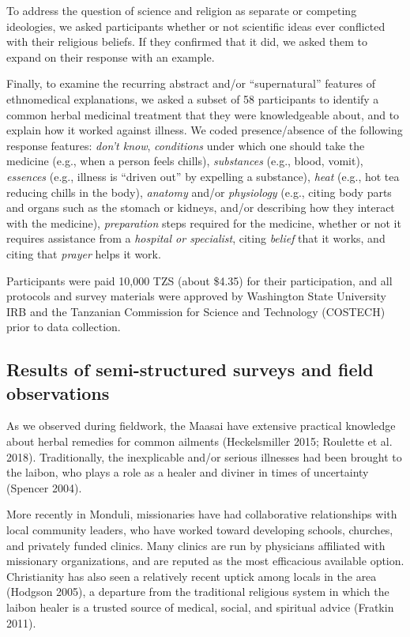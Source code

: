 \documentclass[
  11pt,
]{article}
\begin{document}
To address the question of science and religion as separate or competing ideologies, we asked participants whether or not scientific ideas ever conflicted with their religious beliefs. If they confirmed that it did, we asked them to expand on their response with an example.

Finally, to examine the recurring abstract and/or ``supernatural'' features of ethnomedical explanations, we asked a subset of 58 participants to identify a common herbal medicinal treatment that they were knowledgeable about, and to explain how it worked against illness. We coded presence/absence of the following response features: \emph{don't know}, \emph{conditions} under which one should take the medicine (e.g., when a person feels chills), \emph{substances} (e.g., blood, vomit), \emph{essences} (e.g., illness is ``driven out'' by expelling a substance), \emph{heat} (e.g., hot tea reducing chills in the body), \emph{anatomy} and/or \emph{physiology} (e.g., citing body parts and organs such as the stomach or kidneys, and/or describing how they interact with the medicine), \emph{preparation} steps required for the medicine, whether or not it requires assistance from a \emph{hospital or specialist}, citing \emph{belief} that it works, and citing that \emph{prayer} helps it work.

Participants were paid 10,000 TZS (about \$4.35) for their participation, and all protocols and survey materials were approved by Washington State University IRB and the Tanzanian Commission for Science and Technology (COSTECH) prior to data collection.

\hypertarget{results-of-semi-structured-surveys-and-field-observations}{%
\subsection{Results of semi-structured surveys and field observations}\label{results-of-semi-structured-surveys-and-field-observations}}

As we observed during fieldwork, the Maasai have extensive practical knowledge about herbal remedies for common ailments (Heckelsmiller 2015; Roulette et al. 2018). Traditionally, the inexplicable and/or serious illnesses had been brought to the laibon, who plays a role as a healer and diviner in times of uncertainty (Spencer 2004).

More recently in Monduli, missionaries have had collaborative relationships with local community leaders, who have worked toward developing schools, churches, and privately funded clinics. Many clinics are run by physicians affiliated with missionary organizations, and are reputed as the most efficacious available option. Christianity has also seen a relatively recent uptick among locals in the area (Hodgson 2005), a departure from the traditional religious system in which the laibon healer is a trusted source of medical, social, and spiritual advice (Fratkin 2011).
\end{document}

